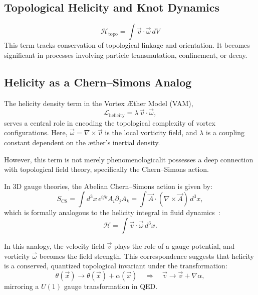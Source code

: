 \subsection{Topological Helicity and Knot Dynamics}
\begin{equation}
    \mathcal{H}_\text{topo} = \int \vec{v} \cdot \vec{\omega} \, dV
\end{equation}
This term tracks conservation of topological linkage and orientation. It becomes significant in processes involving particle transmutation, confinement, or decay.

\subsection{Helicity as a Chern--Simons Analog}
The helicity density term in the Vortex \AE{}ther Model (VAM),
\begin{equation}
\mathcal{L}_{\text{helicity}} = \lambda\, \vec{v} \cdot \vec{\omega},
\end{equation}
serves a central role in encoding the topological complexity of vortex configurations. Here, $\vec{\omega} = \nabla \times \vec{v}$ is the local vorticity field, and $\lambda$ is a coupling constant dependent on the \ae{}ther's inertial density.

However, this term is not merely phenomenological\textemdash it possesses a deep connection with topological field theory, specifically the Chern--Simons action.

In 3D gauge theories, the Abelian Chern--Simons action is given by:
\begin{equation}
S_{\text{CS}} = \int d^3x\, \epsilon^{ijk} A_i \partial_j A_k = \int \vec{A} \cdot (\nabla \times \vec{A})\, d^3x,
\end{equation}
which is formally analogous to the helicity integral in fluid dynamics~\cite{moffatt1969degree, jackiw1990chern}:
\begin{equation}
\mathcal{H} = \int \vec{v} \cdot \vec{\omega}\, d^3x.
\end{equation}

In this analogy, the velocity field $\vec{v}$ plays the role of a gauge potential, and vorticity $\vec{\omega}$ becomes the field strength. This correspondence suggests that helicity is a conserved, quantized topological invariant under the transformation:
\begin{equation}
\theta(\vec{x}) \rightarrow \theta(\vec{x}) + \alpha(\vec{x}) \quad \Rightarrow \quad \vec{v} \rightarrow \vec{v} + \nabla \alpha,
\end{equation}
mirroring a $U(1)$ gauge transformation in QED.


